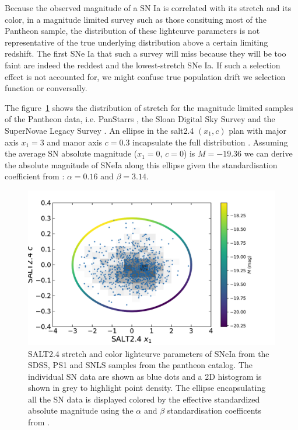 \documentclass[]{aa} %
\begin{document}
Because the
observed magnitude of a SN Ia is correlated with its stretch and its color, in a
magnitude limited survey such as those consituing most of the Pantheon sample,
the distribution of these lightcurve parameters is not representative of the
true underlying distribution above a certain limiting redshift. The first SNe Ia
that such a survey will miss because they will be too faint are indeed the
reddest and the lowest-stretch SNe Ia. If such a selection effect is not
accounted for, we might confuse true population drift we selection function or
conversally.

The figure~\ref{fig:maglim} shows the distribution of stretch for the magnitude
limited samples of the Pantheon data, i.e. PanStarrs \citep[PS1][]{ref}, the
Sloan Digital Sky Survey \citep[SDSS][]{ref} and the SuperNovae Legacy Survey
\citep[SNLS][]{astier2006}. An ellipse in the salt2.4 $(x_1, c)$ plan with major
axis $x_1=3$ and manor axis $c=0.3$ incapsulate the full distribution \citep[see
also][for a similar contour but using a less conservative
$c=0.2$]{campbell2013}. Assuming the average SN absolute magnitude ($x_1=0$,
$c=0$) is $M=-19.36$ \citep{kessler2009,scolnic2014} we can derive the absolute magnitude of
SNeIa along this ellipse given the standardisation coefficient from
\citep{scolnic2018a}: $\alpha=0.16$ and $\beta=3.14$.

\begin{figure}
    \centering
    \includegraphics[width=\linewidth]{Article_figures/zmax_maglim_all.pdf}
    \caption{SALT2.4 stretch and color lightcurve parameters of SNeIa from the
        SDSS, PS1 and SNLS samples from the pantheon catalog. The individual SN
        data are shown as blue dots and a 2D histogram is shown in grey to
        highlight point density. The ellipse encapsulating all the SN data is
        displayed colored by the effective standardized absolute magnitude using
    the $\alpha$ and $\beta$ standardisation coefficents from
\citep{scolnic2018}.}
    \label{fig:maglim}
\end{figure}
\end{document}
